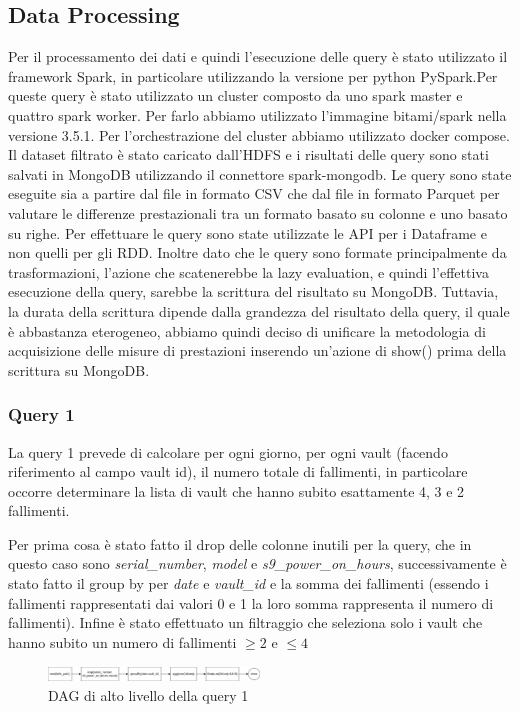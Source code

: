 \documentclass[conference]{IEEEtran}
\begin{document}
\subsection{Data Processing}
Per il processamento dei dati e quindi l'esecuzione delle query è stato utilizzato il framework Spark, in particolare utilizzando la versione per python PySpark.Per queste query è stato utilizzato un cluster composto da uno spark master e quattro spark worker. Per farlo abbiamo utilizzato l'immagine bitami/spark nella versione 3.5.1. Per l'orchestrazione del cluster abbiamo utilizzato docker compose.
Il dataset filtrato è stato caricato dall'HDFS e i risultati delle query sono stati salvati in MongoDB utilizzando il connettore spark-mongodb.
Le query sono state eseguite sia a partire dal file in formato CSV che dal file in formato Parquet per valutare le differenze prestazionali tra un formato basato su colonne e uno basato su righe.
Per effettuare le query sono state utilizzate le API per i Dataframe e non quelli per gli RDD. 
Inoltre dato che le query sono formate principalmente da trasformazioni, l'azione che scatenerebbe la lazy evaluation, e quindi l'effettiva esecuzione della query, sarebbe la scrittura del risultato su MongoDB. Tuttavia, la durata della scrittura dipende dalla grandezza del risultato della query, il quale è abbastanza eterogeneo, abbiamo quindi deciso di unificare la metodologia di acquisizione delle misure di prestazioni inserendo un'azione di show() prima della scrittura su MongoDB.
\subsubsection{Query 1}
La query 1 prevede di calcolare per ogni giorno, per ogni vault (facendo riferimento al campo vault id), il numero totale di fallimenti, in particolare occorre determinare la lista di vault che hanno subito esattamente 4, 3 e 2 fallimenti.

Per prima cosa è stato fatto il drop delle colonne inutili per la query, che in questo caso sono \textit{serial\_number}, \textit{model} e \textit{s9\_power\_on\_hours}, successivamente è stato fatto il group by per \textit{date} e \textit{vault\_id} e la somma dei fallimenti (essendo i fallimenti rappresentati dai valori 0 e 1 la loro somma rappresenta il numero di fallimenti). Infine è stato effettuato un filtraggio che seleziona solo i vault che hanno subito un numero di fallimenti $\geq2$ e $\leq4$
\begin{figure}[H]
    \centerline{\includegraphics[width=0.5\textwidth]{res/query1_dag.png}}
    \caption{DAG di alto livello della query 1}
    \label{fig:dag_query1}
\end{figure}
\end{document}
